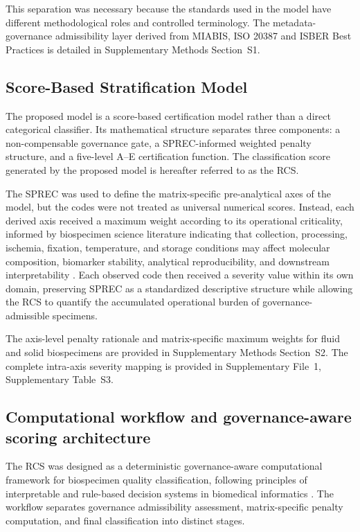 \documentclass[preprint,12pt]{elsarticle}
\begin{document}
This separation was necessary because the standards used in the model have different methodological roles and controlled 
terminology. The metadata-governance admissibility layer derived from MIABIS, ISO 20387 and ISBER Best Practices is detailed in Supplementary 
Methods Section~S1.

\subsection{Score-Based Stratification Model}\label{subsec:category_stratification}

The proposed model is a score-based certification model rather than a direct categorical classifier. Its mathematical structure 
separates three components: a non-compensable governance gate, a SPREC-informed weighted penalty structure, and a five-level A--E 
certification function. The classification score generated by the proposed model is hereafter referred to as the RCS.

The SPREC was used to define the matrix-specific pre-analytical axes of the model, but the codes were not treated as universal 
numerical scores. Instead, each derived axis received a maximum weight according to its operational criticality, informed by 
biospecimen science literature indicating that collection, processing, ischemia, fixation, temperature, and storage conditions may 
affect molecular composition, biomarker stability, analytical reproducibility, and downstream interpretability 
\cite{moore2011brisq,hassis2015,carithers2019,bass2014}. Each observed code then received a severity value within its own domain, 
preserving SPREC as a standardized descriptive structure while allowing the RCS to quantify the accumulated operational burden of 
governance-admissible specimens.

The axis-level penalty rationale and matrix-specific maximum weights for fluid and solid biospecimens are provided in Supplementary Methods 
Section~S2. The complete intra-axis severity mapping is provided in Supplementary File~1, Supplementary Table~S3.

\subsection{Computational workflow and governance-aware scoring architecture}

The RCS was designed as a deterministic governance-aware computational framework for biospecimen quality classification, following 
principles of interpretable and rule-based decision systems in biomedical informatics 
\cite{shortliffe2014,russell2021,rudin2019stop}. The workflow separates governance admissibility assessment, matrix-specific penalty 
computation, and final classification into distinct stages.
\end{document}
